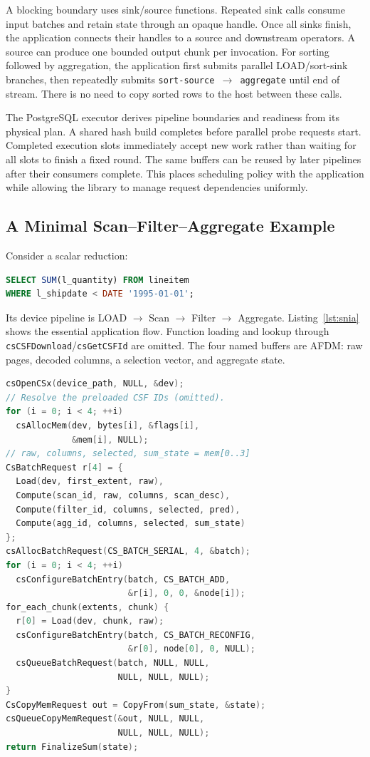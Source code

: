 \documentclass[sigconf, nonacm]{acmart}
\begin{document}
A blocking boundary uses sink/source functions. Repeated sink calls consume
input batches and retain state through an opaque handle. Once all sinks
finish, the application connects their handles to a source and downstream
operators. A source can produce one bounded output chunk per invocation.
For sorting followed by aggregation, the application first submits parallel
LOAD/sort-sink branches, then repeatedly submits
\texttt{sort-source $\rightarrow$ aggregate} until end of stream.
There is no need to copy sorted rows to the host between these calls.

The PostgreSQL executor derives pipeline boundaries and readiness from its
physical plan. A shared hash build completes before parallel probe requests
start. Completed execution slots immediately accept new work rather than
waiting for all slots to finish a fixed round. The same buffers can be
reused by later pipelines after their consumers complete. This places
scheduling policy with the application while allowing the library to manage
request dependencies uniformly.

\subsection{A Minimal Scan--Filter--Aggregate Example}
\label{sec:apidemo}
Consider a scalar reduction:
\begin{lstlisting}[style=demo,language=SQL]
SELECT SUM(l_quantity) FROM lineitem
WHERE l_shipdate < DATE '1995-01-01';
\end{lstlisting}
Its device pipeline is LOAD $\rightarrow$ Scan $\rightarrow$ Filter
$\rightarrow$ Aggregate. Listing~\ref{lst:snia} shows the essential application
flow. Function loading and lookup through
\texttt{csCSFDownload}/\texttt{csGetCSFId} are omitted. The four named buffers are AFDM:
raw pages, decoded columns, a selection vector, and aggregate state.

\begin{lstlisting}[style=demo,language=C,caption={Minimal application composition. Capitalized constructors build application request descriptors; the cs-prefixed calls are the SNIA API.},label={lst:snia}]
csOpenCSx(device_path, NULL, &dev);
// Resolve the preloaded CSF IDs (omitted).
for (i = 0; i < 4; ++i)
  csAllocMem(dev, bytes[i], &flags[i],
             &mem[i], NULL);
// raw, columns, selected, sum_state = mem[0..3]
CsBatchRequest r[4] = {
  Load(dev, first_extent, raw),
  Compute(scan_id, raw, columns, scan_desc),
  Compute(filter_id, columns, selected, pred),
  Compute(agg_id, columns, selected, sum_state)
};
csAllocBatchRequest(CS_BATCH_SERIAL, 4, &batch);
for (i = 0; i < 4; ++i)
  csConfigureBatchEntry(batch, CS_BATCH_ADD,
                        &r[i], 0, 0, &node[i]);
for_each_chunk(extents, chunk) {
  r[0] = Load(dev, chunk, raw);
  csConfigureBatchEntry(batch, CS_BATCH_RECONFIG,
                        &r[0], node[0], 0, NULL);
  csQueueBatchRequest(batch, NULL, NULL,
                      NULL, NULL, NULL);
}
CsCopyMemRequest out = CopyFrom(sum_state, &state);
csQueueCopyMemRequest(&out, NULL, NULL,
                      NULL, NULL, NULL);
return FinalizeSum(state);
\end{lstlisting}
\end{document}
